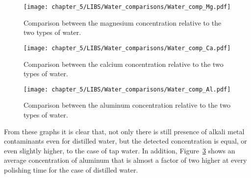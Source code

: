\begin{figure}[H]
   \centering
   \texttt{[image: chapter\_5/LIBS/Water\_comparisons/Water\_comp\_Mg.pdf]} 
   \vspace*{-30pt}
   \caption{Comparison between the magnesium concentration relative to the two types of water.}
   \label{fig:water_comp_mg}
\end{figure}


\begin{figure}[H]
   \centering
   \texttt{[image: chapter\_5/LIBS/Water\_comparisons/Water\_comp\_Ca.pdf]} 
   \vspace*{-30pt}
   \caption{Comparison between the calcium concentration relative to the two types of water.}
   \label{fig:water_comp_ca}
\end{figure}


\begin{figure}[H]
   \centering
   \texttt{[image: chapter\_5/LIBS/Water\_comparisons/Water\_comp\_Al.pdf]} 
   \vspace*{-30pt}
   \caption{Comparison between the aluminum concentration relative to the two types of water.}
   \label{fig:water_comp_al}
\end{figure}

From these graphs it is clear that, not only there is still presence of alkali metal contaminants even for distilled water, but the detected concentration is equal, or even slightly higher, to the case of tap water. In addition, Figure~\ref{fig:water_comp_al} shows an average concentration of aluminum that is almost a factor of two higher at every polishing time for the case of distilled water.

